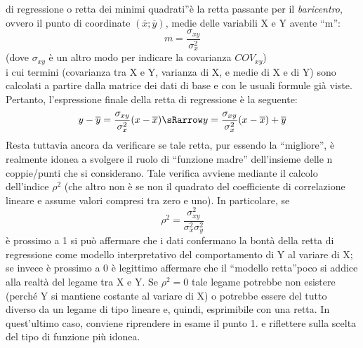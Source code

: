 di regressione  o retta dei minimi quadrati\textquotedblright è la retta 
passante per il \emph{baricentro}, ovvero il punto di coordinate 
$(\overline{x};\overline{y})$, medie delle variabili X e Y avente 
\textquotedblleft m\textquotedblright:
 $$m=\frac{\sigma_{xy}}{\sigma^2_{x}}$$
 (dove $\sigma_{xy}$ è un altro modo per indicare la covarianza 
$COV_{xy}$)\\
 i cui termini (covarianza tra X e Y, varianza di X, e medie di X e di Y) 
sono calcolati a partire dalla matrice dei dati di base e con le usuali 
formule già viste.
 Pertanto, l'espressione finale della retta di regressione è la seguente:
$$y-\overline{y}=\frac{\sigma_{xy}}{\sigma^2_{x}}(x-\overline{x})
  \sRarrow
  y=\frac{\sigma_{xy}}{\sigma^2_{x}}(x-\overline{x})+\overline{y}$$
 Resta tuttavia ancora da verificare se tale retta, pur essendo la 
\textquotedblleft migliore\textquotedblright,  è realmente idonea a 
svolgere il ruolo di \textquotedblleft funzione madre\textquotedblright 
dell'insieme delle n coppie/punti che si considerano. Tale verifica avviene 
mediante il calcolo dell'indice $\rho^2$ (che altro non è se non il 
quadrato del coefficiente di correlazione lineare e assume valori compresi 
tra zero e uno).
 In particolare,  se
 $$\rho^2=\frac{\sigma^2_{xy}}{\sigma^2_{x}\sigma^2_{y}}$$
 è prossimo a 1 si può affermare che i dati confermano la bontà della  
retta di regressione  come modello interpretativo del comportamento di Y al 
variare di X; se invece è prossimo a 0 è legittimo affermare che il 
\textquotedblleft modello retta\textquotedblright poco si addice alla 
realtà del legame tra X e Y.  Se $\rho^2=0$ tale legame potrebbe non 
esistere (perché Y si mantiene costante al variare di X) o potrebbe essere 
del tutto diverso da un legame di tipo lineare e, quindi, esprimibile con 
una retta. In quest'ultimo caso, conviene riprendere in esame il punto 1. e 
riflettere sulla scelta del tipo di funzione più idonea.
